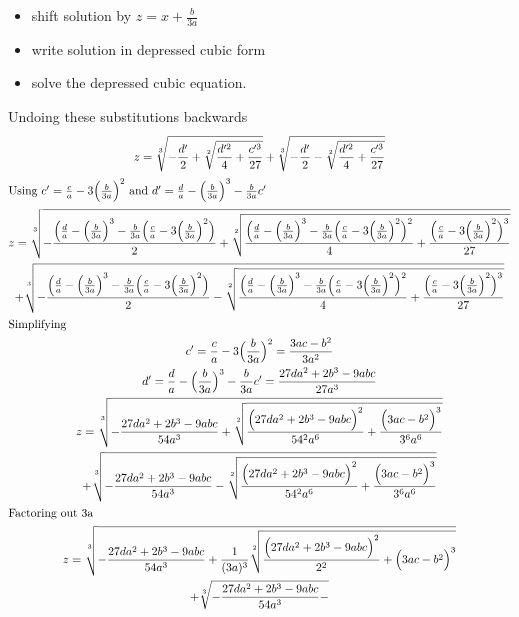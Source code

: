 \documentclass[a4paper]{article}
\begin{document}
\begin{itemize}
\item shift solution by $z=x + \frac{b}{3a}$
\item write solution in depressed cubic form
\item solve the depressed cubic equation. 
\end{itemize}

Undoing these substitutions backwards 
\begin{gather*}
z = \sqrt[3]{-\frac{d'}{2} + \sqrt[2]{\frac{d'^2}{4} +\frac{c'^3}{27}}} + \sqrt[3]{-\frac{d'}{2} - \sqrt[2]{\frac{d'^2}{4} + \frac{c'^3}{27}}}
\\
\intertext{Using $ c' =  \frac{c}{a} - 3 \Big( \frac{b}{3a} \Big)^2 $
and
$d' =\frac{d}{a} - \Big( \frac{b}{3a} \Big)^3 - \frac{b}{3a} c' $}
z = \sqrt[3]{-\frac{\Big( \frac{d}{a} - \Big( \frac{b}{3a} \Big)^3 - \frac{b}{3a} \Big( \frac{c}{a} - 3 \Big( \frac{b}{3a} \Big)^2 \Big)}{2} + \sqrt[2]{\frac{\Big(\frac{d}{a} - \Big( \frac{b}{3a} \Big)^3 - \frac{b}{3a} \Big( \frac{c}{a} - 3 \Big( \frac{b}{3a} \Big)^2 \Big)^2}{4} +\frac{\Big( \frac{c}{a} - 3 \Big( \frac{b}{3a} \Big)^2 \Big)^3}{27}}} 
\\
+
\sqrt[3]{-\frac{\Big( \frac{d}{a} - \Big( \frac{b}{3a} \Big)^3 - \frac{b}{3a} \Big( \frac{c}{a} - 3 \Big( \frac{b}{3a} \Big)^2 \Big)}{2} - \sqrt[2]{\frac{\Big(\frac{d}{a} - \Big( \frac{b}{3a} \Big)^3 - \frac{b}{3a} \Big( \frac{c}{a} - 3 \Big( \frac{b}{3a} \Big)^2 \Big)^2}{4} +\frac{\Big( \frac{c}{a} - 3 \Big( \frac{b}{3a} \Big)^2 \Big)^3}{27}}} 
\\
\intertext{Simplifying}
c' = \frac{c}{a} - 3 \Big( \frac{b}{3a} \Big)^2 =\frac{3ac - b^2}{3 a^2}
\\
d' = \frac{d}{a} - \Big( \frac{b}{3a} \Big)^3 - \frac{b}{3a} c' = \frac{27 d a^2 + 2 b^3 - 9abc}{27 a^3}
\\
z = \sqrt[3]{-\frac{27 d a^2 + 2 b^3 - 9abc}{54 a^3} + \sqrt[2]{\frac{\Big( 27 d a^2 + 2 b^3 - 9abc \Big)^2}{54^2 a^6} +  \frac{\Big (3ac - b^2 \Big)^3}{3^6 a^6}   }} 
\\
+
\sqrt[3]{-\frac{27 d a^2 + 2 b^3 - 9abc}{54 a^3} - \sqrt[2]{\frac{\Big( 27 d a^2 + 2 b^3 - 9abc \Big)^2}{54^2 a^6} + \frac{\Big (3ac - b^2 \Big)^3}{3^6 a^6}}} 
\\
\intertext{Factoring out 3a}
z = \sqrt[3]{-\frac{27 d a^2 + 2 b^3 - 9abc}{54 a^3} + \frac{1}{(3a)^3} \sqrt[2]{\frac{\Big( 27 d a^2 + 2 b^3 - 9abc \Big)^2}{2^2} + \Big (3ac - b^2 \Big)^3}} 
\\
+
\sqrt[3]{-\frac{27 d a^2 + 2 b^3 - 9abc}{54 a^3} - 
}
\end{gather*}
\end{document}
